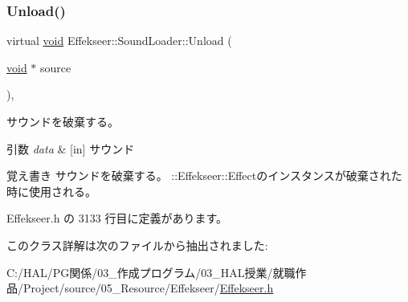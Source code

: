 \subsubsection{\texorpdfstring{Unload()}{Unload()}}
{\footnotesize\ttfamily virtual \mbox{\hyperlink{namespace_effekseer_ab34c4088e512200cf4c2716f168deb56}{void}} Effekseer\+::\+Sound\+Loader\+::\+Unload (\begin{DoxyParamCaption}\item[{\mbox{\hyperlink{namespace_effekseer_ab34c4088e512200cf4c2716f168deb56}{void}} $\ast$}]{source }\end{DoxyParamCaption})\hspace{0.3cm}{\ttfamily [inline]}, {\ttfamily [virtual]}}



サウンドを破棄する。 


\begin{DoxyParams}{引数}
{\em data} & \mbox{[}in\mbox{]} サウンド \\
\hline
\end{DoxyParams}
\begin{DoxyNote}{覚え書き}
サウンドを破棄する。 \+::\+Effekseer\+::\+Effectのインスタンスが破棄された時に使用される。 
\end{DoxyNote}


 Effekseer.\+h の 3133 行目に定義があります。



このクラス詳解は次のファイルから抽出されました\+:\begin{DoxyCompactItemize}
\item 
C\+:/\+H\+A\+L/\+P\+G関係/03\+\_\+作成プログラム/03\+\_\+\+H\+A\+L授業/就職作品/\+Project/source/05\+\_\+\+Resource/\+Effekseer/\mbox{\hyperlink{_effekseer_8h}{Effekseer.\+h}}\end{DoxyCompactItemize}
